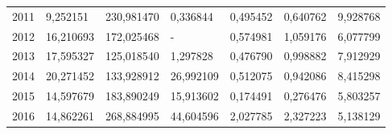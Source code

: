 \begin{table}
\begin{tabular}{p{1cm}p{2cm}p{2cm}p{2cm}p{2cm}p{2cm}p{2cm}}
 2011 &                               9,252151 &      230,981470 &         0,336844 &     0,495452 &          0,640762 &                         9,928768 \\
 2012 &                              16,210693 &      172,025468 &                - &     0,574981 &          1,059176 &                         6,077799 \\
 2013 &                              17,595327 &      125,018540 &         1,297828 &     0,476790 &          0,998882 &                         7,912929 \\
 2014 &                              20,271452 &      133,928912 &        26,992109 &     0,512075 &          0,942086 &                         8,415298 \\
 2015 &                              14,597679 &      183,890249 &        15,913602 &     0,174491 &          0,276476 &                         5,803257 \\
 2016 &                              14,862261 &      268,884995 &        44,604596 &     2,027785 &          2,327223 &                         5,138129 \\
\bottomrule
\end{tabular}
\end{table}
